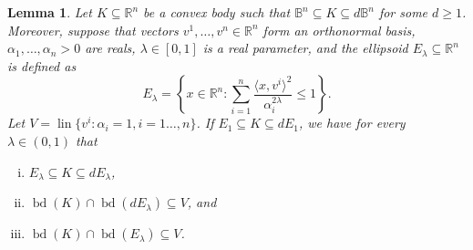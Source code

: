 \documentclass[12pt,a4paper]{article}
\newtheorem{lem}[twr]{Lemma}
\theoremstyle{definition}
\DeclareMathOperator{\bd}{bd}
\DeclareMathOperator{\lin}{lin}
\newcommand\R{\mathbb{R}}
\newcommand\B{\mathbb{B}}
\begin{document}
\begin{lem}
\label{lem:mean_ellpsoid}
Let $K \subseteq \R^n$ be a convex body such that $\B^n \subseteq K \subseteq d \B^n$ for some $d \geq 1$. Moreover, suppose that vectors $v^1, \ldots, v^n \in \R^n$ form an orthonormal basis, $\alpha_1, \ldots, \alpha_n>0$ are reals, $\lambda \in [0,1]$ is a real parameter, and the ellipsoid $E_{\lambda} \subseteq \R^n$ is defined as
$$ E_\lambda = \left\{ x \in \R^n : \sum_{i=1}^n \frac{\langle x, v^i \rangle^2}{\alpha_i^{2 \lambda}} \leq 1 \right\}. $$
Let $V = \lin\{ v^i : \alpha_i=1, i=1\ldots,n\}$. If $E_1 \subseteq K \subseteq d E_1$, we have for every $\lambda \in (0,1)$ that
\begin{enumerate}[(i)]
\item $E_\lambda \subseteq K \subseteq d E_\lambda$,
\item $\bd(K) \cap \bd(d E_\lambda) \subseteq V$, and
\item $\bd(K) \cap \bd( E_\lambda) \subseteq V$.
\end{enumerate}
\end{lem}
\end{document}
